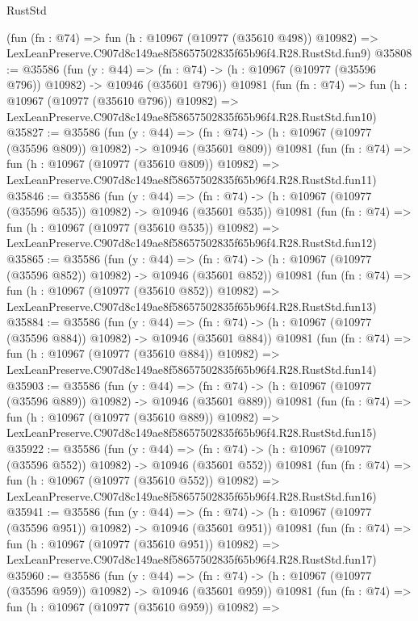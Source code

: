 \begin{lexlean}{RustStd}
\begin{coremodule}
    (fun (fn : @74) =>
    fun (h : @10967 (@10977 (@35610 @498)) @10982) =>
    LexLeanPreserve.C907d8c149ae8f58657502835f65b96f4.R28.RustStd.fun9)
@35808 := @35586
    (fun (y : @44) =>
    (fn : @74) -> (h : @10967 (@10977 (@35596 @796)) @10982) -> @10946 (@35601 @796))
    @10981
    (fun (fn : @74) =>
    fun (h : @10967 (@10977 (@35610 @796)) @10982) =>
    LexLeanPreserve.C907d8c149ae8f58657502835f65b96f4.R28.RustStd.fun10)
@35827 := @35586
    (fun (y : @44) =>
    (fn : @74) -> (h : @10967 (@10977 (@35596 @809)) @10982) -> @10946 (@35601 @809))
    @10981
    (fun (fn : @74) =>
    fun (h : @10967 (@10977 (@35610 @809)) @10982) =>
    LexLeanPreserve.C907d8c149ae8f58657502835f65b96f4.R28.RustStd.fun11)
@35846 := @35586
    (fun (y : @44) =>
    (fn : @74) -> (h : @10967 (@10977 (@35596 @535)) @10982) -> @10946 (@35601 @535))
    @10981
    (fun (fn : @74) =>
    fun (h : @10967 (@10977 (@35610 @535)) @10982) =>
    LexLeanPreserve.C907d8c149ae8f58657502835f65b96f4.R28.RustStd.fun12)
@35865 := @35586
    (fun (y : @44) =>
    (fn : @74) -> (h : @10967 (@10977 (@35596 @852)) @10982) -> @10946 (@35601 @852))
    @10981
    (fun (fn : @74) =>
    fun (h : @10967 (@10977 (@35610 @852)) @10982) =>
    LexLeanPreserve.C907d8c149ae8f58657502835f65b96f4.R28.RustStd.fun13)
@35884 := @35586
    (fun (y : @44) =>
    (fn : @74) -> (h : @10967 (@10977 (@35596 @884)) @10982) -> @10946 (@35601 @884))
    @10981
    (fun (fn : @74) =>
    fun (h : @10967 (@10977 (@35610 @884)) @10982) =>
    LexLeanPreserve.C907d8c149ae8f58657502835f65b96f4.R28.RustStd.fun14)
@35903 := @35586
    (fun (y : @44) =>
    (fn : @74) -> (h : @10967 (@10977 (@35596 @889)) @10982) -> @10946 (@35601 @889))
    @10981
    (fun (fn : @74) =>
    fun (h : @10967 (@10977 (@35610 @889)) @10982) =>
    LexLeanPreserve.C907d8c149ae8f58657502835f65b96f4.R28.RustStd.fun15)
@35922 := @35586
    (fun (y : @44) =>
    (fn : @74) -> (h : @10967 (@10977 (@35596 @552)) @10982) -> @10946 (@35601 @552))
    @10981
    (fun (fn : @74) =>
    fun (h : @10967 (@10977 (@35610 @552)) @10982) =>
    LexLeanPreserve.C907d8c149ae8f58657502835f65b96f4.R28.RustStd.fun16)
@35941 := @35586
    (fun (y : @44) =>
    (fn : @74) -> (h : @10967 (@10977 (@35596 @951)) @10982) -> @10946 (@35601 @951))
    @10981
    (fun (fn : @74) =>
    fun (h : @10967 (@10977 (@35610 @951)) @10982) =>
    LexLeanPreserve.C907d8c149ae8f58657502835f65b96f4.R28.RustStd.fun17)
@35960 := @35586
    (fun (y : @44) =>
    (fn : @74) -> (h : @10967 (@10977 (@35596 @959)) @10982) -> @10946 (@35601 @959))
    @10981
    (fun (fn : @74) =>
    fun (h : @10967 (@10977 (@35610 @959)) @10982) =>

\end{coremodule}
\end{lexlean}
